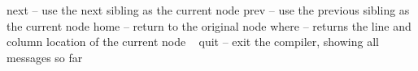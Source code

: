 {\hspace*{0.15in}  next  -- use the next sibling as the current node\newline
\hspace*{0.15in}  prev  -- use the previous sibling as the current node\newline
\hspace*{0.15in}  home  -- return to the original node\newline
\hspace*{0.15in}  where  -- returns the line and column location of the current node \newline
\ \newline
\hspace*{0.15in}  quit  -- exit the compiler, showing all messages so far}
